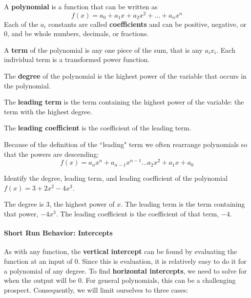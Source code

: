 \begin{definition}
A {\bf polynomial} is a function that can be written as
\[ f(x)=a_0+a_1 x+a_2 x^2+\ldots +a_n x^n \]
Each of the $a_i$ constants are called {\bf coefficients} and can be positive, negative, or 0, and be whole numbers, decimals, or fractions.

A {\bf term} of the polynomial is any one piece of the sum, that is any $a_ix_i$. Each individual term is a transformed power function.

The {\bf degree} of the polynomial is the highest power of the variable that occurs in the polynomial.

The {\bf leading term} is the term containing the highest power of the variable: the term with the highest degree.

The {\bf leading coefficient} is the coefficient of the leading term.

Because of the definition of the ``leading" term we often rearrange polynomials so that the powers are descending:
\[ f(x)=a_n x^n+a_{n-1}x^{n-1}\dots a_2 x^2+a_1 x+a_0 \]
\end{definition}
\begin{example}
Identify the degree, leading term, and leading coefficient of the polynomial $f(x)=3+2x^2-4x^3$.

\begin{solution} The degree is 3, the highest power of $x$. The leading term is the term containing that power, $-4x^3$. The leading coefficient is the coefficient of that term, $-4$.
\end{solution}\end{example}

\paragraph*{Short Run Behavior: Intercepts}
As with any function, the {\bf vertical intercept} can be found by evaluating the function at an input of 0. Since this is evaluation, it is relatively easy to do it for a polynomial of any degree. To find {\bf horizontal intercepts}, we need to solve for when the output will be 0. For general polynomials, this can be a challenging prospect. Consequently, we will limit ourselves to three cases:

